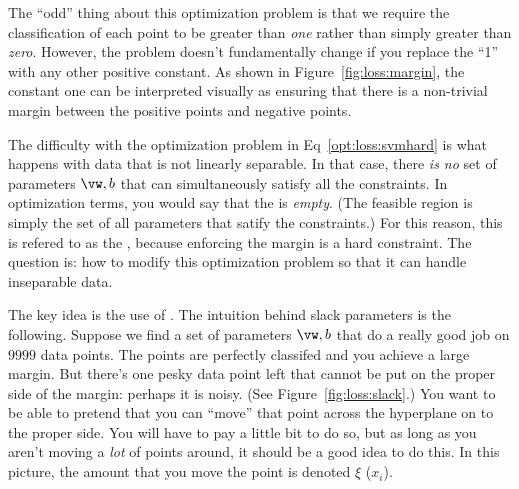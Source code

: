 The ``odd'' thing about this optimization problem is that we require
the classification of each point to be greater than \emph{one} rather
than simply greater than \emph{zero}.  However, the problem doesn't
fundamentally change if you replace the ``1'' with any other positive
constant.  As shown in
Figure~\ref{fig:loss:margin}, the constant one can be interpreted
visually as ensuring that there is a non-trivial margin between the
positive points and negative points.

The difficulty with the optimization problem in
Eq~\eqref{opt:loss:svmhard} is what happens with data that is not
linearly separable.  In that case, there \emph{is no} set of
parameters $\vw,b$ that can simultaneously satisfy all the
constraints.  In optimization terms, you would say that the
 is \emph{empty}.  (The feasible region is
simply the set of all parameters that satify the constraints.)  For
this reason, this is refered to as the ,
because enforcing the margin is a hard constraint.  The question is:
how to modify this optimization problem so that it can handle
inseparable data.


The key idea is the use of .  The intuition
behind slack parameters is the following.  Suppose we find a set of
parameters $\vw,b$ that do a really good job on $9999$ data points.
The points are perfectly classifed and you achieve a large margin.
But there's one pesky data point left that cannot be put on the proper
side of the margin: perhaps it is noisy.  (See
Figure~\ref{fig:loss:slack}.)  You want to be able to pretend that you
can ``move'' that point across the hyperplane on to the proper side.
You will have to pay a little bit to do so, but as long as you aren't
moving a \emph{lot} of points around, it should be a good idea to do
this.  In this picture, the amount that you move the point is denoted
$\xi$ ($x_i$).

